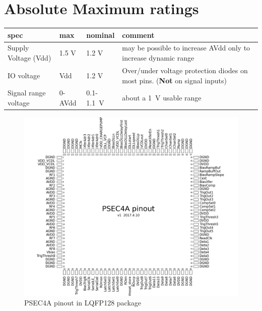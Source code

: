 \documentclass[12pt]{article}
\begin{document}
\section*{Absolute Maximum ratings}
\centering
\begin{tabular}[b!]{l|p{1.4cm}|p{1.7cm}|p{9cm}}
  \hline
   spec       & max & nominal & comment \\ \hline
   Supply Voltage (Vdd) &  1.5 V  & 1.2 V  &   may be possible to increase AVdd only to increase dynamic range\\ \hline
   IO voltage &  Vdd & 1.2 V & Over/under voltage protection diodes on most pins. ({\bf Not} on signal inputs) \\ \hline
   Signal range voltage & 0-AVdd & 0.1-1.1~V & about a 1~V usable range

\end{tabular}

\newpage
\begin{figure}[T!]
    \begin{center}
      \includegraphics[width=18.2cm]{fig/PSEC4a_pinout_LQFP128.png}

    \end{center}
    \caption{PSEC4A pinout in LQFP128 package}
    \label{fig:pinout}
\end{figure}
\end{document}
